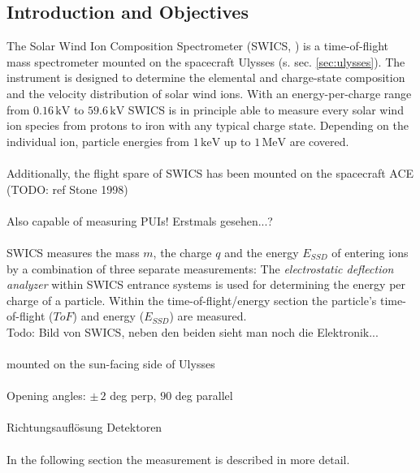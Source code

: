 \subsection{Introduction and Objectives}
The Solar Wind Ion Composition Spectrometer (SWICS, \citet{gloeckler_1992}) is a time-of-flight mass spectrometer mounted on the spacecraft Ulysses (s. sec. \ref{sec:ulysses}). The instrument is designed to determine the elemental and charge-state composition and the velocity distribution of solar wind ions. With an energy-per-charge range from $0.16 \, \mathrm{kV}$ to $59.6 \, \mathrm{kV}$ SWICS is in principle able to measure every solar wind ion species from protons to iron with any typical charge state. Depending on the individual ion, particle energies from $1 \,\mathrm{keV}$ up to $1 \, \mathrm{MeV}$ are covered.
\\ \\
Additionally, the flight spare of SWICS has been mounted on the spacecraft ACE (TODO: ref Stone 1998)
\\ \\ 
Also capable of measuring PUIs! Erstmals gesehen...?
\\ \\
SWICS measures the mass $m$, the charge $q$ and the energy $E_{SSD}$ of entering ions by a combination of three separate measurements: The \textit{electrostatic deflection analyzer} within SWICS entrance systems is used for determining the energy per charge of a particle. Within the time-of-flight/energy section the particle's time-of-flight ($ToF$) and energy ($E_{SSD}$) are measured. \\ 
Todo: Bild von SWICS, neben den beiden sieht man noch die Elektronik...
\\ \\
mounted on the sun-facing side of Ulysses
\\ \\
Opening angles: $\pm\, 2$ deg perp, $90$ deg parallel  
\\ \\
Richtungsauflösung Detektoren
\\ \\ 
In the following section the measurement is described in more detail.
